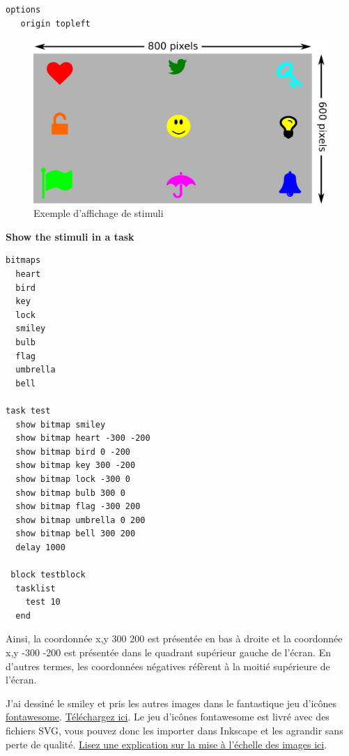 \documentclass[
]{book}
\begin{document}
\begin{verbatim}
options
   origin topleft
\end{verbatim}

\begin{figure}
\centering
\includegraphics{img/coordinates.png}
\caption{Exemple d'affichage de stimuli}
\end{figure}

\textbf{Show the stimuli in a task}

\begin{verbatim}
bitmaps
  heart
  bird
  key
  lock
  smiley
  bulb
  flag
  umbrella
  bell

task test
  show bitmap smiley
  show bitmap heart -300 -200
  show bitmap bird 0 -200
  show bitmap key 300 -200
  show bitmap lock -300 0
  show bitmap bulb 300 0
  show bitmap flag -300 200
  show bitmap umbrella 0 200
  show bitmap bell 300 200
  delay 1000

 block testblock
  tasklist
    test 10
  end
\end{verbatim}

Ainsi, la coordonnée x,y 300 200 est présentée en bas à droite et la coordonnée x,y -300 -200 est présentée dans le quadrant supérieur gauche de l'écran. En d'autres termes, les coordonnées négatives réfèrent à la moitié supérieure de l'écran.

J'ai dessiné le smiley et pris les autres images dans le fantastique jeu d'icônes \href{https://en.wikipedia.org/wiki/Font_Awesome}{fontawesome}. \href{http://fontawesome.io/}{Téléchargez ici}. Le jeu d'icônes fontawesome est livré avec des fichiers SVG, vous pouvez donc les importer dans Inkscape et les agrandir sans perte de qualité. \href{http://www.hiland.com/knowledge-base/bitmap-and-vector-images-understanding-the-difference/}{Lisez une explication sur la mise à l'échelle des images ici}.
\end{document}
